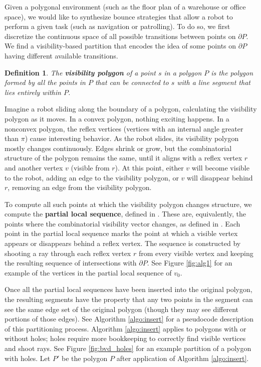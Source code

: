 \documentclass[]{article}
\newtheorem{definition}{Definition}
\begin{document}
Given a polygonal environment (such as the floor plan of a warehouse or office
space), we would like to synthesize bounce strategies that allow a robot to
perform a given task (such as navigation or patrolling).
To do so, we first discretize the continuous space of all possible
transitions between points on $\partial P$. We find a visibility-based partition
that encodes the idea of some points on $\partial P$ having different
available transitions.

\begin{definition}
The \textbf{visibility polygon} of a point $s$ in a polygon $P$ is the polygon
formed by all the points in $P$ that can be connected to $s$ with a line
segment that lies entirely within $P$.
\end{definition}

Imagine a robot sliding along the boundary of a polygon, calculating 
the visibility polygon as it moves. In a convex polygon, nothing exciting 
happens. In a nonconvex polygon, the reflex vertices (vertices with an
internal angle greater than $\pi$) cause interesting
behavior.
As the robot slides, its visibility polygon mostly changes continuously. Edges
shrink or grow, but the combinatorial structure of the polygon remains the same,
until it aligns with a reflex vertex $r$ and another vertex $v$ (visible
from $r$). At this point, either 
$v$ will become visible to the robot, adding an edge to the visibility 
polygon, or $v$ will disappear behind $r$, removing an edge from the visibility polygon.


To compute all such points at which the visibility polygon changes structure, we
 compute the \textbf{partial local sequence}, defined in \cite{rourke_viz}.
These are, equivalently, the points where the combinatorial visibility vector
changes, as defined in \cite{suri2008simple}.
Each point in the partial local sequence marks the point
at which a visible vertex appears or disappears behind a reflex vertex. 
The sequence is constructed by shooting a ray through each reflex vertex $r$ from every
visible vertex and keeping the resulting sequence of intersections with
$\partial P$. See Figure \ref{fig:alg1} for an
example of the vertices in the partial local sequence of $v_0$. 

Once all the partial local sequences have been inserted into the original
polygon, the resulting segments have the property that 
any two points in the segment can see the same edge set of the
original polygon (though they may see different portions of those edges).
See Algorithm \ref{algo:insert} for a pseudocode
description of this partitioning process. Algorithm
\ref{algo:insert} applies to polygons with or without holes; holes 
require more bookkeeping to correctly find visible vertices and shoot
rays. See Figure \ref{fig:bvd_holes} for an example partition of a polygon with
 holes. Let $P'$ be the polygon $P$ after application of Algorithm
\ref{algo:insert}.
\end{document}
